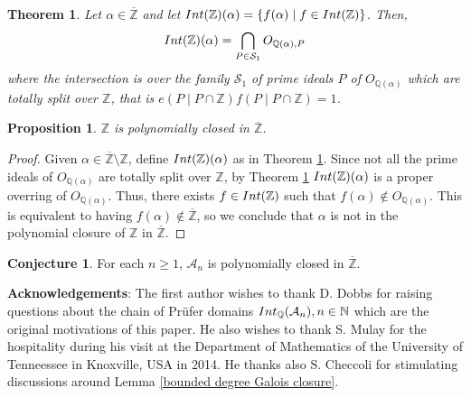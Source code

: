 \documentclass{article}
\newtheorem{Prop}[equation]{Proposition}
\newtheorem{Thm}[equation]{Theorem}
\theoremstyle{definition}\newtheorem{Def}[equation]{Definition}
\theoremstyle{definition}\newtheorem{Ques}[equation]{Question}
\theoremstyle{definition}\newtheorem{Conj}[equation]{Conjecture}
\theoremstyle{definition}\newtheorem{Not}[equation]{Notation}
\newcommand{\N}{\mathbb{N}}
\newcommand{\Q}{\mathbb{Q}}
\newcommand{\oZ}{\overline{\Z}}
\newcommand{\Z}{\mathbb{Z}}
\newcommand{\Int}{\textnormal{Int}}
\newcommand{\IntQ}{\Int_{\Q}}
\numberwithin{equation}{section}
\begin{document}
\begin{Thm}\cite[Theorem]{McQ Split}\label{McQ Theorem}
Let $\alpha\in\oZ$ and let $\Int(\Z)(\alpha)=\{f(\alpha)\mid f\in\Int(\Z)\}$. Then,
$$\Int(\Z)(\alpha)=\bigcap_{P\in\mathcal{S}_1}O_{\Q(\alpha),P}$$
where the intersection is over the family $\mathcal{S}_1$ of prime ideals $P$ of $O_{\Q(\alpha)}$ which are totally split over $\Z$, that is $e(P\mid P\cap\Z)f(P\mid P\cap\Z)=1$. 
\end{Thm}

\begin{Prop}
$\Z$ is polynomially closed in $\oZ$.%
\end{Prop}
\begin{proof}
Given $\alpha\in\oZ\setminus\Z$, define $\Int(\Z)(\alpha)$ as in Theorem \ref{McQ Theorem}. Since not all the prime ideals of $O_{\Q(\alpha)}$ are totally split over $\Z$, by Theorem \ref{McQ Theorem} $\Int(\Z)(\alpha)$ is a proper overring of $O_{\Q(\alpha)}$. Thus, there exists $f\in\Int(\Z)$ such that $f(\alpha)\notin O_{\Q(\alpha)}$. This is equivalent to having $f(\alpha) \notin \oZ$, so we conclude that $\alpha$ is not in the polynomial closure of $\Z$ in $\oZ$.
\end{proof}


\begin{Conj}
For each $n \geq 1$, $\mathcal{A}_n$ is polynomially closed in $\oZ$.
\end{Conj}
\vskip0.5cm

\textbf{Acknowledgements}: The first author wishes to thank D. Dobbs for raising questions about the chain of Pr\"ufer domains $\IntQ(\mathcal{A}_n),n\in\N$ which are the original motivations of this paper. He also wishes to thank S. Mulay for the hospitality during his visit at the Department of Mathematics of the University of Tenneessee in Knoxville, USA in 2014. He thanks also S. Checcoli for stimulating discussions around Lemma \ref{bounded degree Galois closure}.
\end{document}
